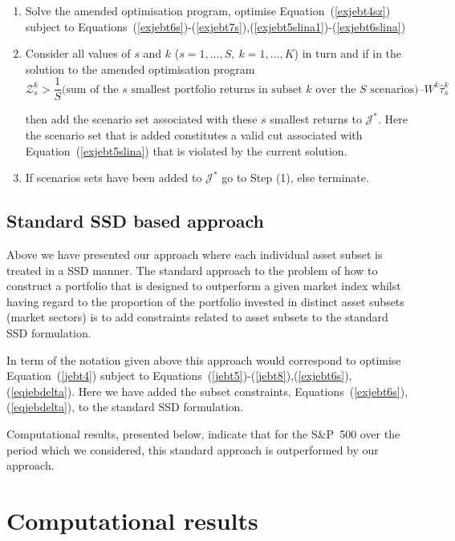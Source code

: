 \begin{enumerate}
\item Solve the amended optimisation program, optimise Equation~(\ref{exjebt4sz}) subject to 
 Equations~(\ref{exjebt6s})-(\ref{exjebt7s}),(\ref{exjebt5slina1})-(\ref{exjebt6slina})

\item Consider all values of $s$ and $k$ ($s=1,\ldots,S,~k=1,\ldots,K$) in turn and if in the solution to the amended optimisation program 
{\footnotesize
\begin{equation}
\mathcal{Z}_s^k >\frac{1}{S} (\mbox{sum of the $s$ smallest portfolio returns in subset $k$ over the $S$ scenarios)} – W^k \hat{\tau}_s^k
\label{jebt9az}
\end{equation}
}

\noindent then add the scenario set associated with these 
$s$ smallest returns to $\mathcal{J^*}$. Here the scenario set that is added constitutes a valid cut associated
with Equation~(\ref{exjebt5slina}) that is violated by the current solution. 
\item If scenarios sets have been added to $\mathcal{J^*}$ go to Step (1), else terminate.
\end{enumerate}

\subsection{Standard SSD based approach}
\label{secalt}

Above we have presented our approach where each individual asset subset is treated in a SSD manner. The standard
approach to the problem 
of how to construct a portfolio that is
designed to outperform a given market index whilst having regard to the proportion of the portfolio invested in distinct asset
subsets (market sectors)
is to add 
 constraints related to asset subsets
to the standard SSD formulation.

In term of the notation given above this approach would correspond to optimise Equation~(\ref{jebt4}) subject to 
Equations~(\ref{jebt5})-(\ref{jebt8}),(\ref{exjebt6s}),(\ref{eqjebdelta}).
Here we have added the subset constraints, Equations~(\ref{exjebt6s}),(\ref{eqjebdelta}), to the standard SSD formulation.

Computational results, presented below, indicate that for the S\&P~500 over the period which we considered, 
this standard approach is outperformed by our approach.

\section{Computational results}
\label{sec5}

